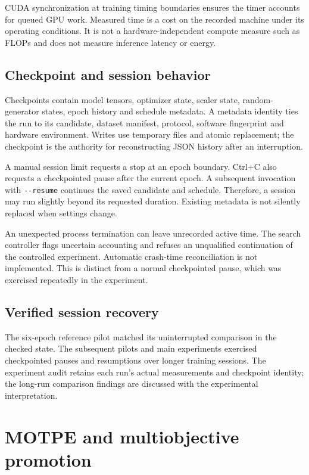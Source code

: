 \documentclass[11pt,a4paper,oneside]{report}
\begin{document}
CUDA synchronization at training timing boundaries ensures the timer accounts for queued GPU work. Measured time is a cost on the recorded machine under its operating conditions. It is not a hardware-independent compute measure such as FLOPs and does not measure inference latency or energy.

\subsection{Checkpoint and session behavior}

Checkpoints contain model tensors, optimizer state, scaler state, random-generator states, epoch history and schedule metadata. A metadata identity ties the run to its candidate, dataset manifest, protocol, software fingerprint and hardware environment. Writes use temporary files and atomic replacement; the checkpoint is the authority for reconstructing JSON history after an interruption.

A manual session limit requests a stop at an epoch boundary. Ctrl+C also requests a checkpointed pause after the current epoch. A subsequent invocation with \texttt{-{}-resume} continues the saved candidate and schedule. Therefore, a session may run slightly beyond its requested duration. Existing metadata is not silently replaced when settings change.

An unexpected process termination can leave unrecorded active time. The search controller flags uncertain accounting and refuses an unqualified continuation of the controlled experiment. Automatic crash-time reconciliation is not implemented. This is distinct from a normal checkpointed pause, which was exercised repeatedly in the experiment.

\subsection{Verified session recovery}

The six-epoch reference pilot matched its uninterrupted comparison in the checked state. The subsequent pilots and main experiments exercised checkpointed pauses and resumptions over longer training sessions. The experiment audit retains each run's actual measurements and checkpoint identity; the long-run comparison findings are discussed with the experimental interpretation.
\section{MOTPE and multiobjective promotion}
\end{document}

